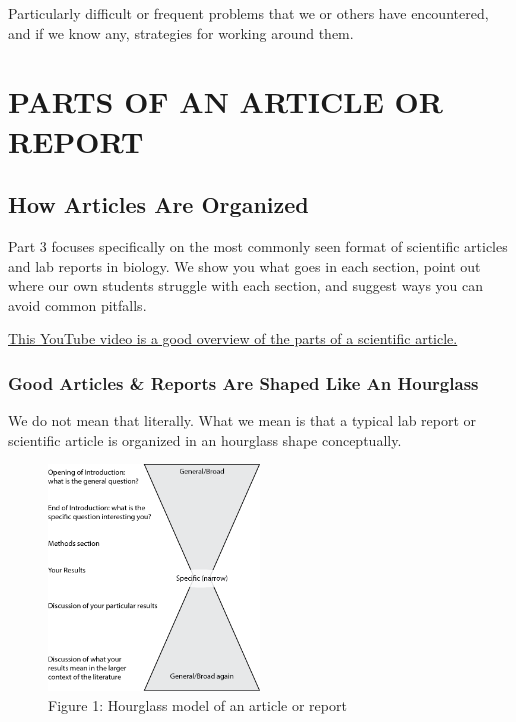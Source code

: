 \documentclass[
]{book}
\begin{document}
Particularly difficult or frequent problems that we or others have encountered, and if we know any, strategies for working around them.

\hypertarget{part-parts-of-an-article-or-report}{%
\part{PARTS OF AN ARTICLE OR REPORT}\label{part-parts-of-an-article-or-report}}

\hypertarget{articleparts300}{%
\chapter{How Articles Are Organized}\label{articleparts300}}

Part 3 focuses specifically on the most commonly seen format of scientific articles and lab reports in biology. We show you what goes in each section, point out where our own students struggle with each section, and suggest ways you can avoid common pitfalls.

\href{https://youtu.be/9lL6xDKpHxw}{This YouTube video is a good overview of the parts of a scientific article.}

\hypertarget{good-articles-reports-are-shaped-like-an-hourglass}{%
\section{Good Articles \& Reports Are Shaped Like An Hourglass}\label{good-articles-reports-are-shaped-like-an-hourglass}}

We do not mean that literally. What we mean is that a typical lab report or scientific article is organized in an hourglass shape conceptually.

\begin{figure}
\centering
\includegraphics[width=0.5\textwidth,height=\textheight]{images/hourglass-writing-model.png}
\caption{Figure 1: Hourglass model of an article or report}
\end{figure}
\end{document}
